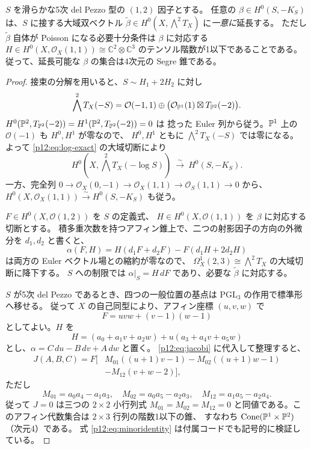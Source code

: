 \begin{theorem}\label{p12:th:extension5}
$S$ を滑らかな5次 del Pezzo 型の $(1,2)$ 因子とする。
任意の $\beta\in H^0(S,-K_S)$ は、$S$ に接する大域双ベクトル
$\widetilde\beta\in H^0(X,\bigwedge^2T_X)$ に\emph{一意に}延長する。
ただし $\widetilde\beta$ 自体が Poisson になる必要十分条件は
$\beta$ に対応する $H\in H^0(X,\mathcal O_X(1,1))\cong\mathbb C^2\otimes\mathbb C^3$
のテンソル階数が1以下であることである。
従って、延長可能な $\beta$ の集合は4次元の Segre 錐である。
\end{theorem}
\begin{proof}
接束の分解を用いると、$S\sim H_1+2H_2$ に対し
\[
\bigwedge^2T_X(-S)
=\mathcal O(-1,1)\oplus
\bigl(\mathcal O_{\mathbb P^1}(1)\boxtimes T_{\mathbb P^2}(-2)\bigr).
\]
$H^0(\mathbb P^2,T_{\mathbb P^2}(-2))=H^1(\mathbb P^2,T_{\mathbb P^2}(-2))=0$ は
捻った Euler 列から従う。$\mathbb P^1$ 上の $\mathcal O(-1)$ も $H^0,H^1$ が零なので、
$H^0,H^1$ ともに $\bigwedge^2T_X(-S)$ では零になる。
よって \eqref{p12:eq:log-exact} の大域切断により
\[
H^0(X,\bigwedge^2T_X(-\log S))\ \xrightarrow{\sim}\ H^0(S,-K_S).
\]
一方、完全列 $0\to\mathcal O_X(0,-1)\to\mathcal O_X(1,1)\to\mathcal O_S(1,1)\to0$
から、$H^0(X,\mathcal O_X(1,1))\xrightarrow{\sim}H^0(S,-K_S)$ も従う。

$F\in H^0(X,\mathcal O(1,2))$ を $S$ の定義式、
$H\in H^0(X,\mathcal O(1,1))$ を $\beta$ に対応する切断とする。
積多重次数を持つアフィン錐上で、二つの射影因子の方向の外微分を $d_1,d_2$ と書くと、
\begin{equation}\label{p12:eq:formdp5}
\alpha(F,H)=H(d_1F+d_2F)-F(d_1H+2d_2H)
\end{equation}
は両方の Euler ベクトル場との縮約が零なので、
$\Omega^1_X(2,3)\cong\bigwedge^2T_X$ の大域切断に降下する。
$S$ への制限では $\alpha|_S=H\,dF$ であり、必要な $\widetilde\beta$ に対応する。

$S$ が5次 del Pezzo であるとき、四つの一般位置の基点は $\mathrm{PGL}_3$ の作用で標準形へ移せる。
従って $X$ の自己同型により、アフィン座標 $(u,v,w)$ で
\[
F=uvw+(v-1)(w-1)
\]
としてよい。$H$ を
\[
H=(a_0+a_1v+a_2w)+u(a_3+a_4v+a_5w)
\]
とし、$\alpha=C\,du-B\,dv+A\,dw$ と置く。
\eqref{p12:eq:jacobi} に代入して整理すると、
\begin{align}\label{p12:eq:minoridentity}
J(A,B,C)=F\bigl[&M_{01}((u+1)v-1)
-M_{02}((u+1)w-1)\\
&-M_{12}(v+w-2)\bigr],\nonumber
\end{align}
ただし
\[
M_{01}=a_0a_4-a_1a_3,\quad
M_{02}=a_0a_5-a_2a_3,\quad
M_{12}=a_1a_5-a_2a_4.
\]
従って $J=0$ は三つの $2\times2$ 小行列式 $M_{01}=M_{02}=M_{12}=0$
と同値である。このアフィン代数集合は $2\times3$ 行列の階数1以下の錐、
すなわち $\operatorname{Cone}(\mathbb P^1\times\mathbb P^2)$（次元4）である。
式 \eqref{p12:eq:minoridentity} は付属コードでも記号的に検証している。
\end{proof}

